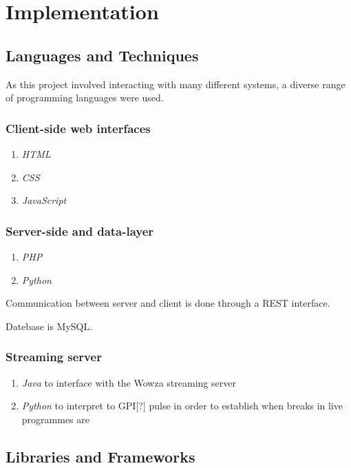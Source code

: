 \documentclass[12pt,a4paper,twoside, titlepage, openright, cleardoublepage=empty]{article}
\begin{document}
\cleardoublepage

\section{Implementation}

\subsection{Languages and Techniques}
As this project involved interacting with many different systems, a diverse range of programming languages were used.

\subsubsection{Client-side web interfaces}
\begin{enumerate}
\item \textit{HTML}
\item \textit{CSS}
\item \textit{JavaScript}
\end{enumerate}

\subsubsection{Server-side and data-layer}
\begin{enumerate}
\item \textit{PHP}
\item \textit{Python}
\end{enumerate}

Communication between server and client is done through a REST interface.

Datebase is MySQL.

\subsubsection{Streaming server}
\begin{enumerate}
\item \textit{Java} to interface with the Wowza streaming server
\item \textit{Python} to interpret to GPI[?] pulse in order to establish when breaks in live programmes are
\end{enumerate}

\subsection{Libraries and Frameworks}
\end{document}
